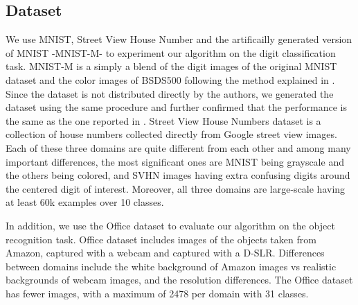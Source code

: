 \begin{table}[ht]
\caption{Accuracy on the digit classification task.}
\label{tab:res2}
\begin{sc}
\begin{small}
\end{small}
\end{sc}
\end{table}

\subsection{Dataset}
We use MNIST\cite{mnist}, Street View House Number\cite{svhn} and the artificailly generated version of MNIST -MNIST-M- \cite{ganin15} to experiment our algorithm on the digit classification task. MNIST-M is a simply a blend of the digit images of the original MNIST dataset and the color images of BSDS500\cite{bsds500} following the method explained in \cite{ganin15}. Since the dataset is not distributed directly by the authors, we generated the dataset using the same procedure and further confirmed that the performance is the same as the one reported in \cite{ganin15}. Street View House Numbers dataset is a collection of house numbers collected directly from Google street view images. Each of these three domains are quite different from each other and among many important differences, the most significant ones are MNIST being grayscale and the others being colored, and SVHN images having extra confusing digits around the centered digit of interest. Moreover, all three domains are large-scale having at least 60k examples over 10 classes. 

In addition, we use the Office\cite{office} dataset to evaluate our algorithm on the object recognition task. Office dataset includes images of the objects taken from Amazon, captured with a webcam and captured with a D-SLR. Differences between domains include the white background of Amazon images vs realistic backgrounds of webcam images, and the resolution differences. The Office dataset has fewer images, with a maximum of 2478 per domain with 31 classes. %


